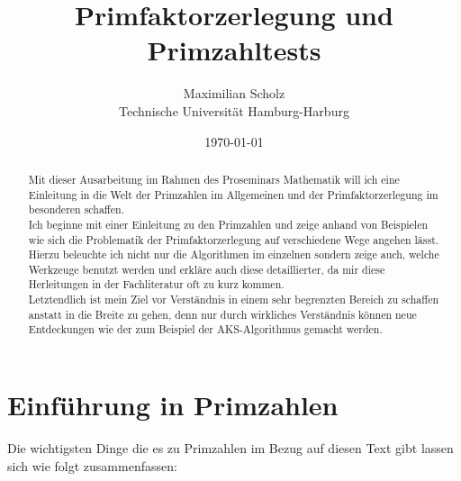 \documentclass[12pt, a4paper, titlepage,twoside]{article}
\title{Primfaktorzerlegung und Primzahltests}
\author{Maximilian Scholz  \\
	Technische Universit\"at Hamburg-Harburg \\
}
\date{\today}
\begin{document}
	
	
	
	\maketitle
	
	\begin{abstract}
		
		Mit dieser Ausarbeitung im Rahmen des Proseminars Mathematik will ich eine Einleitung in die Welt der Primzahlen im Allgemeinen und der Primfaktorzerlegung im besonderen schaffen. \\
		Ich beginne mit einer Einleitung zu den Primzahlen und zeige anhand von Beispielen wie sich die Problematik der Primfaktorzerlegung auf verschiedene Wege angehen l\"asst. Hierzu beleuchte ich nicht nur die Algorithmen im einzelnen sondern zeige auch, welche Werkzeuge benutzt werden und erkl\"are auch diese detaillierter, da mir diese Herleitungen in der Fachliteratur oft zu kurz kommen.\\
		Letztendlich ist mein Ziel vor Verst\"andnis in einem sehr begrenzten Bereich zu schaffen anstatt in die Breite zu gehen, denn nur durch wirkliches Verst\"andnis k\"onnen neue Entdeckungen wie der zum Beispiel der AKS-Algorithmus gemacht werden.
	\end{abstract}
	
	
	
	\tableofcontents %
	\newpage
	
	
	\section{Einf\"uhrung in Primzahlen} \label{Primzahlen}
	Die wichtigsten Dinge die es zu Primzahlen im Bezug auf diesen Text gibt lassen sich wie folgt zusammenfassen:
\end{document}
